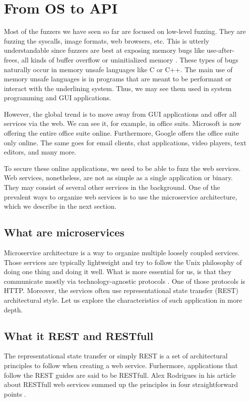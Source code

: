\chapter{From OS to API}
Most of the fuzzers we have seen so far are focused on low-level fuzzing. They are fuzzing the syscalls, image formats, web browsers, etc. This is utterly understandable since fuzzers are best at exposing memory bugs like use-after-frees, all kinds of buffer overflow or uninitialized memory \cite{chang2017oss}. These types of bugs naturally occur in memory unsafe languages like C or C++. The main use of memory unsafe languages is in programs that are meant to be performant or interact with the underlining system. Thus, we may see them used in system programming and GUI applications.

However, the global trend is to move away from GUI applications and offer all services via the web. We can see it, for example, in office suits. Microsoft is now offering the entire office suite online. Furthermore, Google offers the office suite only online. The same goes for email clients, chat applications, video players, text editors, and many more.

To secure these online applications, we need to be able to fuzz the web services. Web services, nonetheless, are not as simple as a single application or binary. They may consist of several other services in the background. One of the prevalent ways to organize web services is to use the microservice architecture, which we describe in the next section.

\section{What are microservices}
Microservice architecture is a way to organize multiple loosely coupled services. Those services are typically lightweight and try to follow the Unix philosophy of doing one thing and doing it well. What is more essential for us, is that they communicate mostly via technology-agnostic protocols \cite{nadareishvili2016microservice}. One of those protocols is HTTP. Moreover, the services often use representational state transfer (REST) architectural style. Let us explore the characteristics of such application in more depth.

\section{What it REST and RESTfull}
The representational state transfer or simply REST is a set of architectural principles to follow when creating a web service. Furhermore, applications that follow the REST guides are said to be RESTfull. Alex Rodrigues in his article about RESTfull web services summed up the principles in four straightforward points \cite{rodriguez2008restful}.

